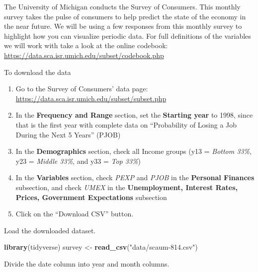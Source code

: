 \documentclass[]{book}
\newenvironment{Shaded}{\begin{snugshade}}{\end{snugshade}}
\newcommand{\KeywordTok}[1]{\textcolor[rgb]{0.13,0.29,0.53}{\textbf{{#1}}}}
\newcommand{\DataTypeTok}[1]{\textcolor[rgb]{0.13,0.29,0.53}{{#1}}}
\newcommand{\StringTok}[1]{\textcolor[rgb]{0.31,0.60,0.02}{{#1}}}
\newcommand{\NormalTok}[1]{{#1}}
\providecommand{\tightlist}{%
  \setlength{\itemsep}{0pt}\setlength{\parskip}{0pt}}
\theoremstyle{definition}
\theoremstyle{definition}
\theoremstyle{remark}
\begin{document}
The University of Michigan conducts the Survey of Consumers. This
monthly survey takes the pulse of consumers to help predict the state of
the economy in the near future. We will be using a few responses from
this monthly survey to highlight how you can visualize periodic data.
For full definitions of the variables we will work with take a look at
the online codebook:
\url{https://data.sca.isr.umich.edu/subset/codebook.php}

To download the data

\begin{enumerate}
\def\labelenumi{\arabic{enumi}.}
\tightlist
\item
  Go to the Survey of Consumers' data page:
  \url{https://data.sca.isr.umich.edu/subset/subset.php}
\item
  In the \textbf{Frequency and Range} section, set the \textbf{Starting
  year} to 1998, since that is the first year with complete data on
  ``Probability of Losing a Job During the Next 5 Years'' (PJOB)
\item
  In the \textbf{Demographics} section, check all Income groups (y13 =
  \emph{Bottom 33\%}, y23 = \emph{Middle 33\%}, and y33 = \emph{Top
  33\%})
\item
  In the \textbf{Variables} section, check \emph{PEXP} and \emph{PJOB}
  in the \textbf{Personal Finances} subsection, and check \emph{UMEX} in
  the \textbf{Unemployment, Interest Rates, Prices, Government
  Expectations} subsection
\item
  Click on the ``Download CSV'' button.
\end{enumerate}

Load the downloaded dataset.

\begin{Shaded}
\begin{Highlighting}[]
\KeywordTok{library}\NormalTok{(tidyverse)}
\NormalTok{survey <-}\StringTok{ }\KeywordTok{read_csv}\NormalTok{(}\StringTok{"data/scaum-814.csv"}\NormalTok{)}
\end{Highlighting}
\end{Shaded}

Divide the date column into year and month columns.

\begin{Shaded}
\end{Shaded}
\end{document}
